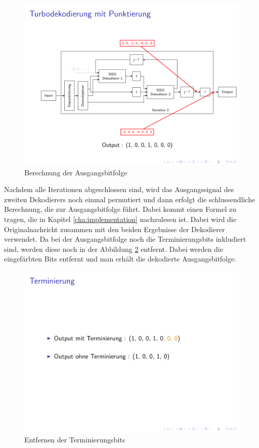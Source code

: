 \begin{figure}[!ht]
\centering
\includegraphics[width=\ScaleIfNeeded]{pictures/TurboDecodePunctured4}
\caption{Berechnung der Ausgangsbitfolge}
\label{pic:TurboDecodeBack}
\end{figure}

Nachdem alle Iterationen abgeschlossen sind, wird das Ausgangssignal des zweiten Dekodierers noch einmal permutiert und dann erfolgt die schlussendliche Berechnung, die zur Ausgangsbitfolge führt. Dabei kommt einen Formel zu tragen, die in Kapitel \ref{cha:implementation} nachzulesen ist. Dabei wird die Originalnachricht zusammen mit den beiden Ergebnisse der Dekodierer verwendet. Da bei der Ausgangsbitfolge noch die Terminierungsbits inkludiert sind, werden diese noch in der Abbildung \ref{pic:TurboDecodeTerminate} entfernt. Dabei werden die eingefärbten Bits entfernt und man erhält die dekodierte Ausgangsbitfolge.

\begin{figure}[!ht]
\centering
\includegraphics[width=\ScaleIfNeeded]{pictures/TurboDecodePunctured5}
\caption{Entfernen der Terminierungsbits}
\label{pic:TurboDecodeTerminate}
\end{figure}

